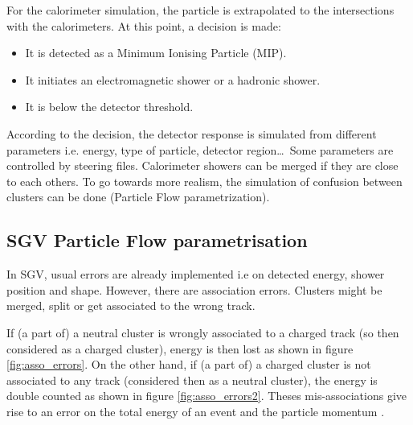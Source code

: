 For the calorimeter simulation, the particle is extrapolated to the intersections with the calorimeters. At this point, a decision is made:

\begin{itemize}
  \item It is detected as a Minimum Ionising Particle (MIP).
  \item It initiates an electromagnetic shower or a hadronic shower.
  \item It is below the detector threshold.
\end{itemize}

According to the decision, the detector response is simulated from different parameters i.e. energy, type of particle, detector region\ldots\ Some parameters are controlled by steering files. Calorimeter showers can be merged if they are close to each others. To go towards more realism, the simulation of confusion between clusters can be done (Particle Flow parametrization).

\subsection{SGV Particle Flow parametrisation}

In SGV, usual errors are already implemented i.e on detected energy, shower position and shape. However, there are association errors. Clusters might be merged, split or get associated to the wrong track.

If (a part of) a neutral cluster is wrongly associated to a charged track (so then considered as a charged cluster), energy is then lost as shown in figure \ref{fig:asso_errors}. On the other hand, if (a part of) a charged cluster is not associated to any track (considered then as a neutral cluster), the energy is double counted as shown in figure \ref{fig:asso_errors2}. Theses mis-associations give rise to an error on the total energy of an event and the particle momentum \cite{Chera2014}.

